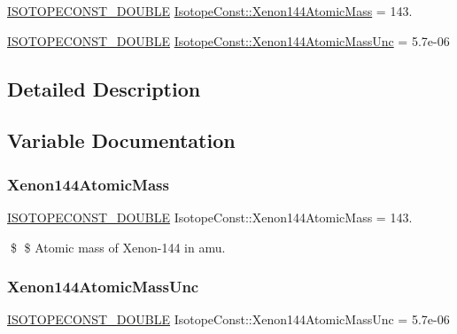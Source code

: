\begin{DoxyCompactItemize}
\item 
\mbox{\hyperlink{group___isotope_const-_macros_ga8f45a7272ce02c0b4c65c44636ed719a}{I\+S\+O\+T\+O\+P\+E\+C\+O\+N\+S\+T\+\_\+\+D\+O\+U\+B\+LE}} \mbox{\hyperlink{group___isotope_const-_xenon-_xe144_ga6212b5182507cbd6c063aa335891fa55}{Isotope\+Const\+::\+Xenon144\+Atomic\+Mass}} = 143.
\item 
\mbox{\hyperlink{group___isotope_const-_macros_ga8f45a7272ce02c0b4c65c44636ed719a}{I\+S\+O\+T\+O\+P\+E\+C\+O\+N\+S\+T\+\_\+\+D\+O\+U\+B\+LE}} \mbox{\hyperlink{group___isotope_const-_xenon-_xe144_ga0b15ff34430e23cd7cf33681f9401069}{Isotope\+Const\+::\+Xenon144\+Atomic\+Mass\+Unc}} = 5.\+7e-\/06
\end{DoxyCompactItemize}


\subsection{Detailed Description}


\subsection{Variable Documentation}
\mbox{\label{group___isotope_const-_xenon-_xe144_ga6212b5182507cbd6c063aa335891fa55}} 
\subsubsection{\texorpdfstring{Xenon144\+Atomic\+Mass}{Xenon144AtomicMass}}
{\footnotesize\ttfamily \mbox{\hyperlink{group___isotope_const-_macros_ga8f45a7272ce02c0b4c65c44636ed719a}{I\+S\+O\+T\+O\+P\+E\+C\+O\+N\+S\+T\+\_\+\+D\+O\+U\+B\+LE}} Isotope\+Const\+::\+Xenon144\+Atomic\+Mass = 143.}

\$ \$ Atomic mass of Xenon-\/144 in amu. \mbox{\label{group___isotope_const-_xenon-_xe144_ga0b15ff34430e23cd7cf33681f9401069}} 
\subsubsection{\texorpdfstring{Xenon144\+Atomic\+Mass\+Unc}{Xenon144AtomicMassUnc}}
{\footnotesize\ttfamily \mbox{\hyperlink{group___isotope_const-_macros_ga8f45a7272ce02c0b4c65c44636ed719a}{I\+S\+O\+T\+O\+P\+E\+C\+O\+N\+S\+T\+\_\+\+D\+O\+U\+B\+LE}} Isotope\+Const\+::\+Xenon144\+Atomic\+Mass\+Unc = 5.\+7e-\/06}


